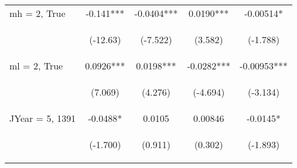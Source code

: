 \documentclass[]{article}
\begin{document}
\begin{center}
\begin{tabular}{lcccc}
        mh = 2, True     & -0.141***                                       & -0.0404***                                     & 0.0190***                                      & -0.00514*                                      \\
        \vspace{4pt}     & \begin{footnotesize}(-12.63)\end{footnotesize}  & \begin{footnotesize}(-7.522)\end{footnotesize} & \begin{footnotesize}(3.582)\end{footnotesize}  & \begin{footnotesize}(-1.788)\end{footnotesize} \\
        ml = 2, True     & 0.0926***                                       & 0.0198***                                      & -0.0282***                                     & -0.00953***                                    \\
        \vspace{4pt}     & \begin{footnotesize}(7.069)\end{footnotesize}   & \begin{footnotesize}(4.276)\end{footnotesize}  & \begin{footnotesize}(-4.694)\end{footnotesize} & \begin{footnotesize}(-3.134)\end{footnotesize} \\
        JYear = 5, 1391  & -0.0488*                                        & 0.0105                                         & 0.00846                                        & -0.0145*                                       \\
        \vspace{4pt}     & \begin{footnotesize}(-1.700)\end{footnotesize}  & \begin{footnotesize}(0.911)\end{footnotesize}  & \begin{footnotesize}(0.302)\end{footnotesize}  & \begin{footnotesize}(-1.893)\end{footnotesize} \\

\end{tabular}
\end{center}
\end{document}
